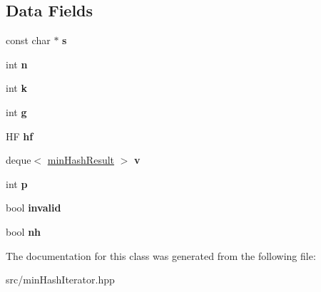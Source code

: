 \subsection*{Data Fields}
\begin{DoxyCompactItemize}
\item 
\mbox{\label{classminHashIterator_ad05e840d8a315e193b35497789fc3319}} 
const char $\ast$ {\bfseries s}
\item 
\mbox{\label{classminHashIterator_a6d7e96f6299aa0b01628a6bd6b541ced}} 
int {\bfseries n}
\item 
\mbox{\label{classminHashIterator_ade7fdf92321e8c8679ef69c8af456edf}} 
int {\bfseries k}
\item 
\mbox{\label{classminHashIterator_a786da2d08105020ecdfac1f704dcfbe5}} 
int {\bfseries g}
\item 
\mbox{\label{classminHashIterator_a77d9060f9b1807bee2ac9a617675225e}} 
HF {\bfseries hf}
\item 
\mbox{\label{classminHashIterator_a49a64c953ce77286df6090c76389ccaf}} 
deque$<$ \hyperlink{structminHashResult}{min\+Hash\+Result} $>$ {\bfseries v}
\item 
\mbox{\label{classminHashIterator_a8a202dd68b78af713732147fefc3e925}} 
int {\bfseries p}
\item 
\mbox{\label{classminHashIterator_af2a3882d3012a31c2ac042686ad77feb}} 
bool {\bfseries invalid}
\item 
\mbox{\label{classminHashIterator_a2ca65e3836ac7cde083edfdd5c4cdabe}} 
bool {\bfseries nh}
\end{DoxyCompactItemize}


The documentation for this class was generated from the following file\+:\begin{DoxyCompactItemize}
\item 
src/min\+Hash\+Iterator.\+hpp\end{DoxyCompactItemize}

